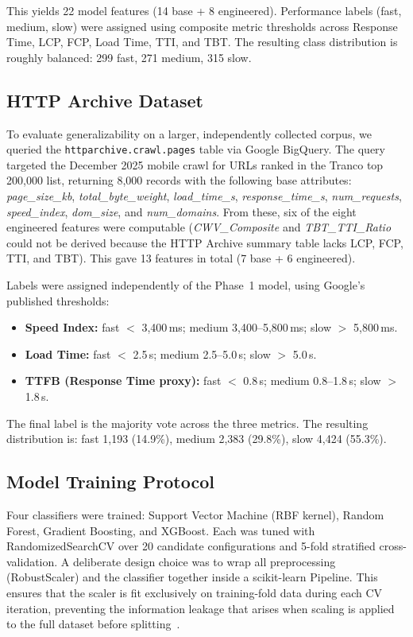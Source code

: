 \documentclass[sn-nature]{sn-jnl}
\begin{document}
This yields 22 model features (14 base + 8 engineered). Performance labels (fast, medium, slow) were assigned using composite metric thresholds across Response Time, LCP, FCP, Load Time, TTI, and TBT. The resulting class distribution is roughly balanced: 299 fast, 271 medium, 315 slow.

\subsection{HTTP Archive Dataset}

To evaluate generalizability on a larger, independently collected corpus, we queried the \texttt{httparchive.crawl.pages} table via Google BigQuery. The query targeted the December 2025 mobile crawl for URLs ranked in the Tranco top 200,000 list, returning 8,000 records with the following base attributes: \textit{page\_size\_kb}, \textit{total\_byte\_weight}, \textit{load\_time\_s}, \textit{response\_time\_s}, \textit{num\_requests}, \textit{speed\_index}, \textit{dom\_size}, and \textit{num\_domains}. From these, six of the eight engineered features were computable (\textit{CWV\_Composite} and \textit{TBT\_TTI\_Ratio} could not be derived because the HTTP Archive summary table lacks LCP, FCP, TTI, and TBT). This gave 13 features in total (7 base + 6 engineered).

Labels were assigned independently of the Phase~1 model, using Google's published thresholds:
\begin{itemize}
    \item \textbf{Speed Index:} fast $<$ 3,400\,ms; medium 3,400--5,800\,ms; slow $>$ 5,800\,ms.
    \item \textbf{Load Time:} fast $<$ 2.5\,s; medium 2.5--5.0\,s; slow $>$ 5.0\,s.
    \item \textbf{TTFB (Response Time proxy):} fast $<$ 0.8\,s; medium 0.8--1.8\,s; slow $>$ 1.8\,s.
\end{itemize}
The final label is the majority vote across the three metrics. The resulting distribution is: fast 1,193 (14.9\%), medium 2,383 (29.8\%), slow 4,424 (55.3\%).

\subsection{Model Training Protocol}

Four classifiers were trained: Support Vector Machine (RBF kernel), Random Forest, Gradient Boosting, and XGBoost. Each was tuned with RandomizedSearchCV over 20 candidate configurations and 5-fold stratified cross-validation. A deliberate design choice was to wrap all preprocessing (RobustScaler) and the classifier together inside a scikit-learn Pipeline. This ensures that the scaler is fit exclusively on training-fold data during each CV iteration, preventing the information leakage that arises when scaling is applied to the full dataset before splitting~\cite{xin2023, dakic2025}.
\end{document}
